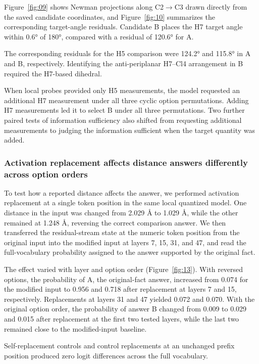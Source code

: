 Figure~\ref{fig:09} shows Newman projections along C2\(\to\)C3 drawn directly from the saved candidate coordinates, and Figure~\ref{fig:10} summarizes the corresponding target-angle residuals. Candidate B places the H7 target angle within 0.6° of 180°, compared with a residual of 120.6° for A. 

The corresponding residuals for the H5 comparison were 124.2° and 115.8° in A and B, respectively. Identifying the anti-periplanar H7--Cl4 arrangement in B required the H7-based dihedral.

When local probes provided only H5 measurements, the model requested an additional H7 measurement under all three cyclic option permutations. Adding H7 measurements led it to select B under all three permutations. Two further paired tests of information sufficiency also shifted from requesting additional measurements to judging the information sufficient when the target quantity was added.

\subsubsection{Activation replacement affects distance answers differently across option orders}

To test how a reported distance affects the answer, we performed activation replacement at a single token position in the same local quantized model.\citep{ref16} One distance in the input was changed from 2.029 Å to 1.029 Å, while the other remained at 1.248 Å, reversing the correct comparison answer. We then transferred the residual-stream state at the numeric token position from the original input into the modified input at layers 7, 15, 31, and 47, and read the full-vocabulary probability assigned to the answer supported by the original fact.

The effect varied with layer and option order (Figure~\ref{fig:13}). With reversed options, the probability of A, the original-fact answer, increased from 0.074 for the modified input to 0.956 and 0.718 after replacement at layers 7 and 15, respectively. Replacements at layers 31 and 47 yielded 0.072 and 0.070. With the original option order, the probability of answer B changed from 0.009 to 0.029 and 0.015 after replacement at the first two tested layers, while the last two remained close to the modified-input baseline. 

Self-replacement controls and control replacements at an unchanged prefix position produced zero logit differences across the full vocabulary.

